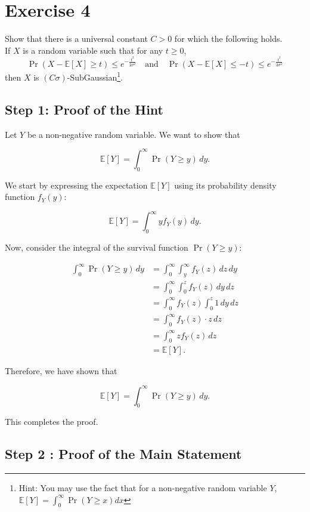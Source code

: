 \documentclass[a4 paper]{article}
\theoremstyle{boldStyle}
\theoremstyle{boldBlueStyle}
\theoremstyle{boldPurpleStyle}
\theoremstyle{boldRedStyle}
\begin{document}
\newpage
\section*{Exercise 4}
\textcolor{blueColor}{
Show that there is a universal constant \(C > 0\) for which the following holds. \\
If \(X\) is a random variable such that for any \(t \geq 0\),
\[
\Pr(X - \mathbb{E}[X] \geq t) \leq e^{-\frac{t^2}{2\sigma^2}} \quad \text{and} \quad \Pr(X - \mathbb{E}[X] \leq -t) \leq e^{-\frac{t^2}{2\sigma^2}}
\]
then \(X\) is \((C\sigma)\)-SubGaussian\footnote{Hint: You may use the fact that for a non-negative random variable \(Y\), \(\mathbb{E}[Y] = \int_0^\infty \Pr(Y \geq x)dx\)}.
}

\bigbreak

\subsection*{Step 1: Proof of the Hint}


Let \(Y\) be a non-negative random variable. We want to show that

\[
\mathbb{E}[Y] = \int_0^\infty \Pr(Y \geq y) \, dy.
\]

We start by expressing the expectation \(\mathbb{E}[Y]\) using its probability density function \(f_Y(y)\):

\[
\mathbb{E}[Y] = \int_0^\infty y f_Y(y) \, dy.
\]

Now, consider the integral of the survival function \(\Pr(Y \geq y)\):

\begin{align*}
\int_0^\infty \Pr(Y \geq y) \, dy &= \int_0^\infty \int_y^\infty f_Y(z) \, dz \, dy \\
&= \int_0^\infty \int_0^z f_Y(z) \, dy \, dz \\
&= \int_0^\infty f_Y(z) \int_0^z 1 \, dy \, dz \\
&= \int_0^\infty f_Y(z) \cdot z \, dz \\
&= \int_0^\infty z f_Y(z) \, dz \\
&= \mathbb{E}[Y].
\end{align*}

Therefore, we have shown that

\[
\mathbb{E}[Y] = \int_0^\infty \Pr(Y \geq y) \, dy.
\]

This completes the proof.

\subsection*{Step 2 : Proof of the Main Statement}
\end{document}
